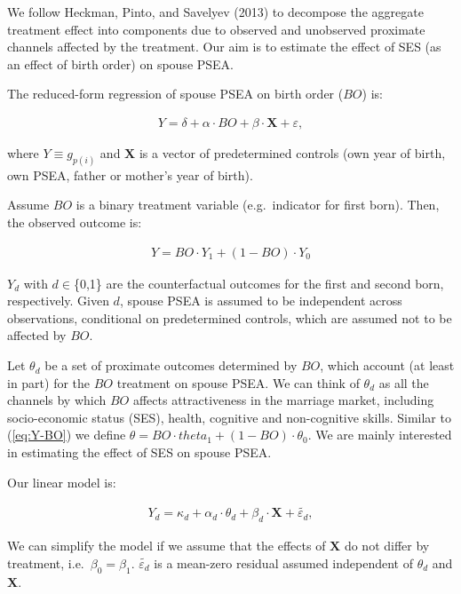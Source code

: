 \documentclass[
]{article}
\begin{document}
We follow Heckman, Pinto, and Savelyev (2013) to decompose the aggregate treatment
effect into components due to observed and unobserved proximate channels
affected by the treatment. Our aim is to estimate the effect of SES (as
an effect of birth order) on spouse PSEA.

The reduced-form regression of spouse PSEA on birth order (\(BO\)) is:

\begin{align}
Y  = \delta +\alpha \cdot BO+\beta \cdot \textbf{X} + \varepsilon,
\end{align}

where \(Y \equiv g_{p(i)}\) and \(\textbf{X}\) is a vector of predetermined
controls (own year of birth, own PSEA, father or mother's year of
birth).

Assume \(BO\) is a binary treatment variable (e.g.~indicator for first
born). Then, the observed outcome is:

\begin{align}
Y = BO \cdot Y_1 + (1-BO) \cdot Y_0  \label{eq:Y-BO}
\end{align}

\(Y_d\) with \(d\in\)\{0,1\} are the counterfactual outcomes for the first and
second born, respectively. Given \(d\), spouse PSEA is assumed to be
independent across observations, conditional on predetermined controls,
which are assumed not to be affected by \(BO\).

Let \(\theta_d\) be a set of proximate outcomes determined by \(BO\), which
account (at least in part) for the \(BO\) treatment on spouse PSEA. We can
think of \(\theta_d\) as all the channels by which \(BO\) affects
attractiveness in the marriage market, including socio-economic status
(SES), health, cognitive and non-cognitive skills. Similar to
(\ref{eq:Y-BO}) we define
\(\theta = BO\cdot theta_1 + (1-BO)\cdot\theta_0\). We are mainly
interested in estimating the effect of SES on spouse PSEA.

Our linear model is:

\begin{align}
Y_d = \kappa_d +\alpha_d \cdot \theta_d+\beta_d \cdot  \textbf{X}+\tilde{\varepsilon_d},  \label{eq:linear-model}
\end{align}

We can simplify the model if we assume that the effects of \(\textbf{X}\)
do not differ by treatment, i.e.~\(\beta_0=\beta_1\).
\(\tilde{\varepsilon_d}\) is a mean-zero residual assumed independent of
\(\theta_d\) and \(\textbf{X}\).
\end{document}
